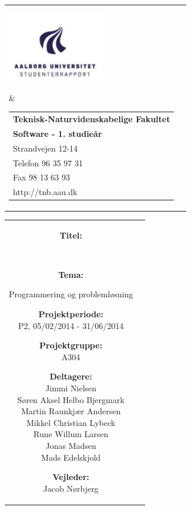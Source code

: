 \begin{titlepage}
    \setlength{\textwidth}{15cm}
	\noindent
	\begin{nopagebreak}
	{\samepage 
			\begin{tabular}{lr}
				\parbox{0.5\textwidth}{\raisebox{11mm}
					{\includegraphics[height=3.0cm]{Figurer/Billeder/aauLogo.jpg}}
				} &
				\parbox{0.5\textwidth}{
					\small
					\begin{tabular}{l}
						{\sf\small \textbf{Teknisk-Naturvidenskabelige Fakultet }}\\
						{\sf\small  \textbf{Software - 1. studieår}} \\
						{\sf\small Strandvejen 12-14} \\
						{\sf\small Telefon 96 35 97 31} \\
						{\sf\small Fax 98 13 63 93} \\
						{\sf\small http://tnb.aau.dk}
					\end{tabular}
				}
			\end{tabular}
			
			\noindent
			\begin{tabular}{cc}
				\parbox{7cm}{
					\begin{description}
			
						\item {\bf Titel:} 
			
							\textbf{\rapportnavn}\\
							
			  
						\item {\bf Tema:}

							Programmering og problemløsning
			
						\item {\bf Projektperiode:}\\
			  				P2, 05/02/2014 - 31/06/2014
			 				\hspace{4cm}
						\item {\bf Projektgruppe:}\\
							A304
			  				\hspace{4cm}
						\item {\bf Deltagere:}\\
							Jimmi Nielsen\\
							Søren Aksel Helbo Bjergmark\\
							Martin Raunkjær Andersen\\
							Mikkel Christian Lybeck\\
							Rune Willum Larsen\\
							Jonas Madsen\\
							Mads Edelskjold
							\hspace{2cm}
						\item {\bf Vejleder:}\\
							Jacob Nørbjerg


\end{description}}
\end{tabular}}
\end{nopagebreak}
\end{titlepage}
